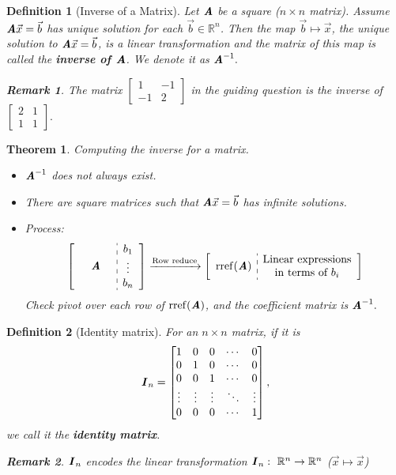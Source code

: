 \documentclass[12pt, a4paper]{article}
\newtheorem{thm}{Theorem}[subsection]
\newtheorem{df}{Definition}[subsection]
\newtheorem*{rmk}{\indent Remark}
\def\R{{\mathbb{R}}}
\def\rref{\mathrm{rref}}
\def\vecx{\vec{x}}
\def\vecb{\vec{b}}
\def\matrixA{\textbf{\emph{A}}}
\def\matrixI{\textbf{\emph{I}}}
\begin{document}
\begin{df}[Inverse of a Matrix]
	Let $\matrixA$ be a square ($n\times n$ matrix). Assume $\matrixA\vecx=\vecb$ has unique solution for each $\vecb\in\R^n$. Then the map $\vecb\longmapsto\vecx$, the unique solution to $\matrixA\vecx=\vecb$, is a linear transformation and the matrix of this map is called the \textbf{inverse of $\matrixA$}. We denote it as $\matrixA^{-1}.$
	\begin{rmk}
		The matrix $\begin{bmatrix}1&-1\\-1&2\end{bmatrix}$ in the guiding question is the inverse of $\begin{bmatrix}2&1\\1&1\end{bmatrix}.$	
	\end{rmk}
\end{df}
\begin{thm}
	Computing the inverse for a matrix.
	\begin{itemize}
		\item $\matrixA^{-1}$ does not always exist. 
		\item There are square matrices such that $\matrixA\vecx=\vecb$ has infinite solutions.
		\item Process:
		\[\left[\begin{array}{c:c}\quad\matrixA\quad &\begin{matrix}b_1\\\vdots\\b_n\end{matrix}\end{array}\right]\xrightarrow{\text{Row reduce}}\left[\begin{array}{c:c}\rref(\matrixA) &\begin{matrix}\text{Linear expressions}\\\text{in terms of }b_i\end{matrix}\end{array}\right]\]
		Check pivot over each row of $\rref(\matrixA)$, and the coefficient matrix is $\matrixA^{-1}.$
	\end{itemize}	
\end{thm}
\begin{df}[Identity matrix]
	For an $n\times n$ matrix, if it is \[\matrixI_n=\begin{bmatrix}1&0&0&\cdots&0\\0&1&0&\cdots&0\\0&0&1&\cdots&0\\\vdots&\vdots&\vdots&\ddots&\vdots\\0&0&0&\cdots&1\end{bmatrix},\] we call it the \textbf{identity matrix}. 
	\begin{rmk}
		$\matrixI_n$ encodes the linear transformation $\matrixI_n:\ \R^n\rightarrow\R^n$ ($\vecx\longmapsto\vecx$)
	\end{rmk}
\end{df}
\end{document}
